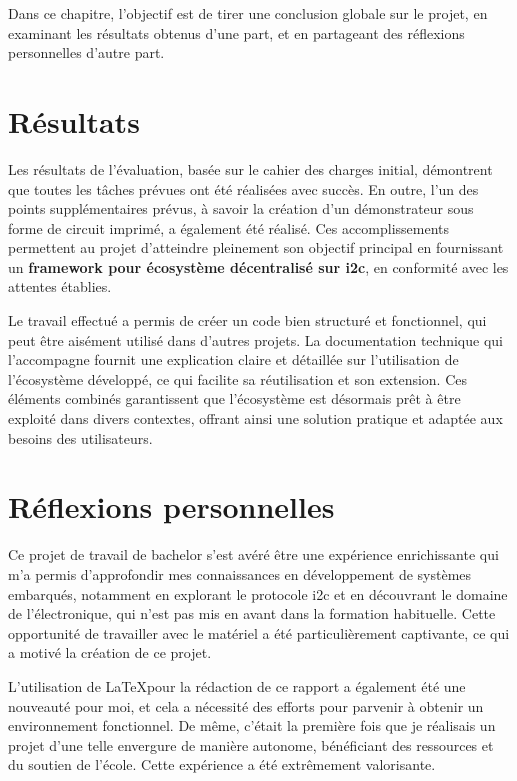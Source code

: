 Dans ce chapitre, l'objectif est de tirer une conclusion globale sur le projet, en examinant les résultats obtenus d'une part, et en partageant des réflexions personnelles d'autre part.

\section{Résultats}

Les résultats de l'évaluation, basée sur le cahier des charges initial, démontrent que toutes les tâches prévues ont été réalisées avec succès.
En outre, l'un des points supplémentaires prévus, à savoir la création d'un démonstrateur sous forme de circuit imprimé, a également été réalisé.
Ces accomplissements permettent au projet d'atteindre pleinement son objectif principal en fournissant un \textbf{\gls{framework} pour écosystème décentralisé sur \gls{i2c}}, en conformité avec les attentes établies.

Le travail effectué a permis de créer un code bien structuré et fonctionnel, qui peut être aisément utilisé dans d'autres projets.
La documentation technique qui l'accompagne fournit une explication claire et détaillée sur l'utilisation de l'écosystème développé, ce qui facilite sa réutilisation et son extension.
Ces éléments combinés garantissent que l'écosystème est désormais prêt à être exploité dans divers contextes, offrant ainsi une solution pratique et adaptée aux besoins des utilisateurs.

\section{Réflexions personnelles}

Ce projet de travail de bachelor s'est avéré être une expérience enrichissante qui m'a permis d'approfondir mes connaissances en développement de systèmes embarqués, notamment en explorant le protocole \gls{i2c} et en découvrant le domaine de l'électronique, qui n'est pas mis en avant dans la formation habituelle.
Cette opportunité de travailler avec le matériel a été particulièrement captivante, ce qui a motivé la création de ce projet.

L'utilisation de \LaTeX pour la rédaction de ce rapport a également été une nouveauté pour moi, et cela a nécessité des efforts pour parvenir à obtenir un environnement fonctionnel.
De même, c'était la première fois que je réalisais un projet d'une telle envergure de manière autonome, bénéficiant des ressources et du soutien de l'école.
Cette expérience a été extrêmement valorisante.

